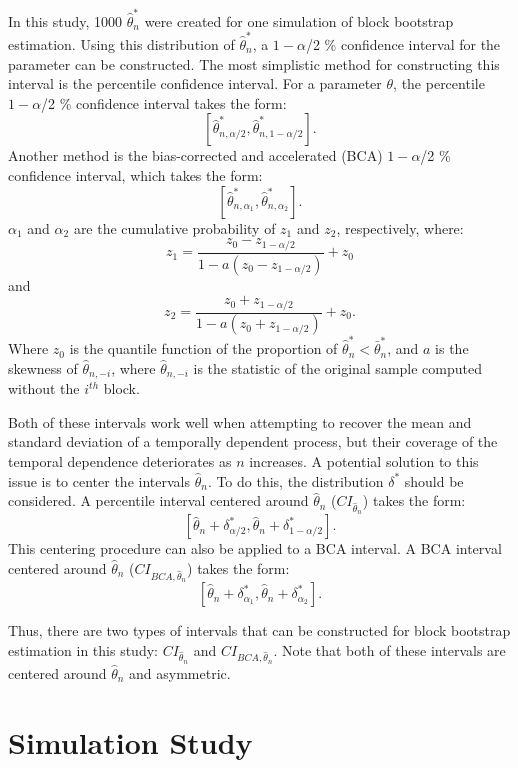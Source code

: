 \documentclass[12pt, letterpaper, titlepage]{article}
\begin{document}
In this study, 1000 $\hat\theta_n^*$ were created for one simulation of block
bootstrap estimation. Using this distribution of $\hat\theta_n^*$, a
$1 - \alpha$/2 \% confidence interval for the parameter can be constructed. 
The most simplistic method for constructing this interval is the percentile
confidence interval. For a parameter $\theta$, the percentile $1 - \alpha$/2
\% confidence interval takes the form: 
\[ [\hat\theta_{n, \alpha/2}^*, \hat\theta_{n, 1 - \alpha/2}^*].\] 
Another method is the bias-corrected and accelerated 
(BCA) $1 - \alpha$/2 \% confidence interval, which takes the form: 
\[ [\hat\theta_{n, \alpha_1}^*,\hat\theta_{n, \alpha_2}^*].\] 
$\alpha_{1}$ and $\alpha_{2}$ are the cumulative probability of $z_{1}$ and
$z_{2}$, respectively, where:
\[z_{1} = \frac{z_{0} - z_{1 - \alpha/2}}{1 - a(z_{0} - z_{1 - \alpha/2})} +
z_{0}\] and
\[z_{2} = \frac{z_{0} + z_{1 - \alpha/2}}{1 - a(z_{0} + z_{1 - \alpha/2})} +
z_{0}.\] 
Where $z_0$ is the quantile function of the proportion of
$\hat\theta_n^* < \bar\theta_n^*$, and $a$ is the skewness of
$\hat{\theta}_{n, -i}$, where $\hat{\theta}_{n, -i}$ is the statistic of the
original sample computed without the $i^{th}$ block.
	
	
Both of these intervals work well when attempting to recover the mean and
standard deviation of a temporally dependent process, but their coverage of
the temporal dependence deteriorates as $n$ increases. A potential solution to
this issue is to center the intervals $\hat{\theta}_{n}$. To do this, the
distribution $\delta^*$ should be considered. A percentile interval centered
around $\hat{\theta}_{n}$ ($CI_{\hat{\theta}_{n}}$) takes the form:
\[ [\hat{\theta}_{n} + \delta^*_{\alpha/2},
  \hat{\theta}_{n} + \delta^*_{1 - \alpha/2}].\] 
This centering procedure can also be applied to a BCA interval. A BCA interval
centered around $\hat{\theta}_{n}$ ($CI_{BCA, \hat{\theta}_{n}}$) takes the
form:
\[ [\hat{\theta}_{n} + \delta^*_{\alpha_1},
  \hat{\theta}_{n} + \delta^*_{\alpha_2}].\] 


Thus, there are two types of intervals that can be constructed for block
bootstrap estimation in this study: $CI_{\hat{\theta}_{n}}$ and
$CI_{BCA, \hat{\theta}_{n}}$. Note that both of these intervals are centered
around $\hat{\theta}_{n}$ and asymmetric. 


\section{Simulation Study}
\label{sec:simstudy}
\end{document}
